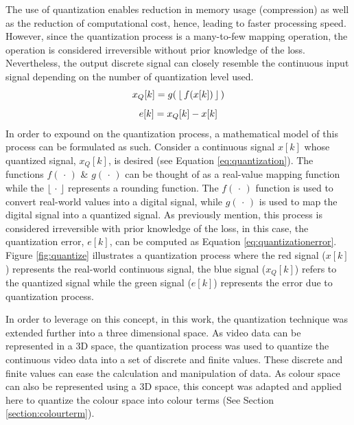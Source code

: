 The use of quantization enables reduction in memory usage (compression) as well as the reduction of computational cost, hence, leading to faster processing speed. However, since the quantization process is a many-to-few mapping operation, the operation is considered irreversible without prior knowledge of the loss. Nevertheless, the output discrete signal can closely resemble the continuous input signal depending on the number of quantization level used.
\begin{equation}\centering
\label{eq:quantization}
x_Q[k] = g( \mspace{3mu}\lfloor \mspace{3mu}f(x[k]) \mspace{3mu}\rfloor\mspace{3mu})
\end{equation} 
\vspace{-3em}
\begin{equation}\centering
\label{eq:quantizationerror}
e[k] = x_Q[k] - x[k]
\end{equation}
In order to expound on the quantization process, a mathematical model of this process can be formulated as such. Consider a continuous signal $x[k]$ whose quantized signal, $x_Q[k]$, is desired (see Equation \ref{eq:quantization}). The functions $f (\mspace{3mu} \cdot  \mspace{3mu})$ \& $g (\mspace{3mu} \cdot  \mspace{3mu})$ can be thought of as a real-value mapping function while the $\lfloor \mspace{3mu} \cdot  \mspace{3mu} \rfloor$ represents a rounding function. The $f (\mspace{3mu} \cdot  \mspace{3mu})$ function is used to convert real-world values into a digital signal, while $g (\mspace{3mu} \cdot  \mspace{3mu})$ is used to map the digital signal into a quantized signal. As previously mention, this process is considered irreversible with prior knowledge of the loss, in this case, the quantization error, $e[k]$, can be computed as Equation \ref{eq:quantizationerror}. Figure \ref{fig:quantize} illustrates a quantization process where the red signal ($x[k]$) represents the real-world continuous signal, the blue signal ($x_Q[k]$) refers to the quantized signal while the green signal ($e[k]$) represents the error due to quantization process.

In order to leverage on this concept, in this work, the quantization technique was extended further into a three dimensional space. As video data can be represented in a 3D space, the quantization process was used to quantize the continuous video data into a set of discrete and finite values. These discrete and finite values can ease the calculation and manipulation of data. As colour space can also be represented using a 3D space, this concept was adapted and applied here to quantize the colour space into colour terms (See Section \ref{section:colourterm}).




